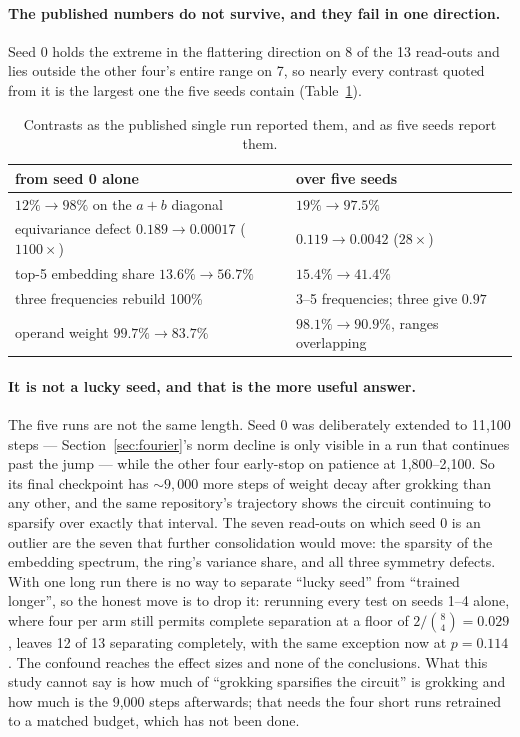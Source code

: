 \documentclass[11pt]{article}
\begin{document}
\paragraph{The published numbers do not survive, and they fail in one
direction.} Seed 0 holds the extreme in the flattering direction on 8 of the 13
read-outs and lies outside the other four's entire range on 7, so nearly every
contrast quoted from it is the largest one the five seeds contain
(Table~\ref{tab:seed0}).

\begin{table}[h]
  \centering
  \caption{Contrasts as the published single run reported them, and as five
  seeds report them.}
  \label{tab:seed0}
  \begin{tabular}{ll}
    \toprule
    from seed 0 alone & over five seeds \\
    \midrule
    $12\% \to 98\%$ on the $a{+}b$ diagonal & $19\% \to 97.5\%$ \\
    equivariance defect $0.189 \to 0.00017$ ($1100\times$) & $0.119 \to 0.0042$ ($28\times$) \\
    top-5 embedding share $13.6\% \to 56.7\%$ & $15.4\% \to 41.4\%$ \\
    three frequencies rebuild 100\% & 3--5 frequencies; three give $0.97$ \\
    operand weight $99.7\% \to 83.7\%$ & $98.1\% \to 90.9\%$, ranges overlapping \\
    \bottomrule
  \end{tabular}
\end{table}

\paragraph{It is not a lucky seed, and that is the more useful answer.} The
five runs are not the same length. Seed 0 was deliberately extended to 11{,}100
steps --- Section~\ref{sec:fourier}'s norm decline is only visible in a run
that continues past the jump --- while the other four early-stop on patience at
1{,}800--2{,}100. So its final checkpoint has ${\sim}9{,}000$ more steps of
weight decay after grokking than any other, and the same repository's
trajectory shows the circuit continuing to sparsify over exactly that interval.
The seven read-outs on which seed 0 is an outlier are the seven that further
consolidation would move: the sparsity of the embedding spectrum, the ring's
variance share, and all three symmetry defects. With one long run there is no
way to separate ``lucky seed'' from ``trained longer'', so the honest move is
to drop it: rerunning every test on seeds 1--4 alone, where four per arm still
permits complete separation at a floor of $2/\binom{8}{4} = 0.029$, leaves 12
of 13 separating completely, with the same exception now at $p = 0.114$. The
confound reaches the effect sizes and none of the conclusions. What this study
cannot say is how much of ``grokking sparsifies the circuit'' is grokking and
how much is the 9{,}000 steps afterwards; that needs the four short runs
retrained to a matched budget, which has not been done.
\end{document}
